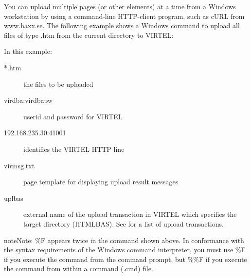 \documentclass[letterpaper,10pt,english]{sphinxmanual}
\begin{document}
You can upload multiple pages (or other elements) at a time from a Windows workstation by using a command-line HTTP-client program, such as cURL from www.haxx.se.
The following example shows a Windows command to upload all files of type .htm from the current directory to VIRTEL:

\begin{sphinxVerbatim}[commandchars=\\\{\}]
         
 
\end{sphinxVerbatim}

In this example:
\begin{description}
\item[{*.htm}] \leavevmode
the files to be uploaded

\item[{virdba:virdbapw}] \leavevmode
userid and password for VIRTEL

\item[{192.168.235.30:41001}] \leavevmode
identifies the VIRTEL HTTP line

\item[{virmsg.txt}] \leavevmode
page template for displaying upload result messages

\item[{uplbas}] \leavevmode
external name of the upload transaction in VIRTEL which specifies the target directory (HTMLBAS). See {\hyperref[\detokenize{User_Guide:v457ug-http-uploading-pages-signon}]{}} for a list of upload transactions.

\end{description}

\begin{sphinxadmonition}{note}{Note:}
\%F appears twice in the command shown above. In conformance with the syntax requirements of the Windows command interpreter, you must use \%F if you execute the command from the command prompt, but \%\%F if you execute the command from within a command (.cmd) file.
\end{sphinxadmonition}
\end{document}
